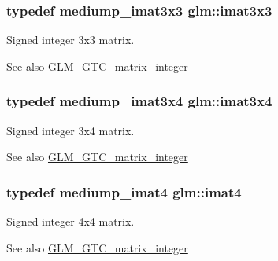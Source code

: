 \subsubsection[{imat3x3}]{\setlength{\rightskip}{0pt plus 5cm}typedef mediump\+\_\+imat3x3 {\bf glm\+::imat3x3}}\label{group__gtc__matrix__integer_gaeff9ef8f56cccc828d6b897923e75402}
Signed integer 3x3 matrix. \begin{DoxySeeAlso}{See also}
\hyperlink{group__gtc__matrix__integer}{G\+L\+M\+\_\+\+G\+T\+C\+\_\+matrix\+\_\+integer} 
\end{DoxySeeAlso}
\hypertarget{group__gtc__matrix__integer_gaee5507e6cbbdd05841a0c174e60dd036}{}
\subsubsection[{imat3x4}]{\setlength{\rightskip}{0pt plus 5cm}typedef mediump\+\_\+imat3x4 {\bf glm\+::imat3x4}}\label{group__gtc__matrix__integer_gaee5507e6cbbdd05841a0c174e60dd036}
Signed integer 3x4 matrix. \begin{DoxySeeAlso}{See also}
\hyperlink{group__gtc__matrix__integer}{G\+L\+M\+\_\+\+G\+T\+C\+\_\+matrix\+\_\+integer} 
\end{DoxySeeAlso}
\hypertarget{group__gtc__matrix__integer_ga40fc5c5e0b07543497aa1c314891544a}{}
\subsubsection[{imat4}]{\setlength{\rightskip}{0pt plus 5cm}typedef mediump\+\_\+imat4 {\bf glm\+::imat4}}\label{group__gtc__matrix__integer_ga40fc5c5e0b07543497aa1c314891544a}
Signed integer 4x4 matrix. \begin{DoxySeeAlso}{See also}
\hyperlink{group__gtc__matrix__integer}{G\+L\+M\+\_\+\+G\+T\+C\+\_\+matrix\+\_\+integer} 
\end{DoxySeeAlso}
\hypertarget{group__gtc__matrix__integer_ga7e733984837e0e7aa9f4aac18f632f63}{}
